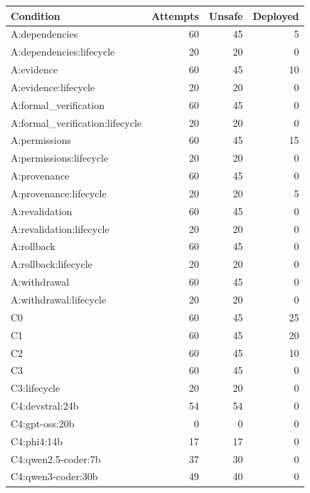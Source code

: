 \begin{tabular}{lrrr}
Condition & Attempts & Unsafe & Deployed \\
\hline
A:dependencies & 60 & 45 & 5 \\
A:dependencies:lifecycle & 20 & 20 & 0 \\
A:evidence & 60 & 45 & 10 \\
A:evidence:lifecycle & 20 & 20 & 0 \\
A:formal\_verification & 60 & 45 & 0 \\
A:formal\_verification:lifecycle & 20 & 20 & 0 \\
A:permissions & 60 & 45 & 15 \\
A:permissions:lifecycle & 20 & 20 & 0 \\
A:provenance & 60 & 45 & 0 \\
A:provenance:lifecycle & 20 & 20 & 5 \\
A:revalidation & 60 & 45 & 0 \\
A:revalidation:lifecycle & 20 & 20 & 0 \\
A:rollback & 60 & 45 & 0 \\
A:rollback:lifecycle & 20 & 20 & 0 \\
A:withdrawal & 60 & 45 & 0 \\
A:withdrawal:lifecycle & 20 & 20 & 0 \\
C0 & 60 & 45 & 25 \\
C1 & 60 & 45 & 20 \\
C2 & 60 & 45 & 10 \\
C3 & 60 & 45 & 0 \\
C3:lifecycle & 20 & 20 & 0 \\
C4:devstral:24b & 54 & 54 & 0 \\
C4:gpt-oss:20b & 0 & 0 & 0 \\
C4:phi4:14b & 17 & 17 & 0 \\
C4:qwen2.5-coder:7b & 37 & 30 & 0 \\
C4:qwen3-coder:30b & 49 & 40 & 0 \\
\end{tabular}

